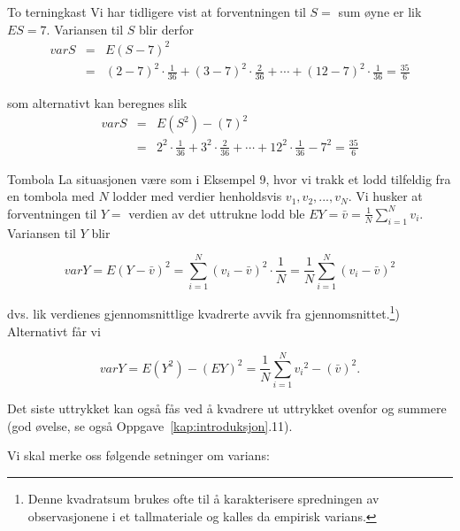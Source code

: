 \begin{eksempel}{To terningkast}
Vi har tidligere vist at forventningen til $S =$ sum øyne er lik
$ES=7$. Variansen til $S$ blir derfor
\begin{eqnarray*}
 varS&=&E{(S-7)}^2\\
 &=& {(2-7)}^2 \cdot \frac{1}{36}+{(3-7)}^2 \cdot \frac{2}{36}+ \cdots
           +{(12-7)}^2 \cdot \frac{1}{36}=\frac{35}{6}
\end{eqnarray*}

\noindent som alternativt kan beregnes slik
\begin{eqnarray*}
 varS&=&E(S^2)-{(7)}^2 \\
 &=& 2^2 \cdot \frac{1}{36}+3^2 \cdot \frac{2}{36}+ \cdots
            +{12}^2 \cdot \frac{1}{36}-7^2 =\frac{35}{6}
\end{eqnarray*}
\end{eksempel}
\begin{eksempel}{Tombola}
La situasjonen være som i Eksempel 9, hvor vi trakk et lodd
tilfeldig fra en tombola med $N$ lodder med verdier henholdsvis
$v_1, v_2, ..., v_N$. Vi husker at forventningen til $Y =$
verdien av det uttrukne lodd ble $EY=\bar{v}=\frac{1}{N}\sum_{i=1}^Nv_i$.
Variansen til $Y$ blir

\[   varY=E{(Y-\bar{v})}^2=\sum_{i=1}^N{(v_i-\bar{v})}^2 \cdot \frac{1}{N}=
                   \frac{1}{N} \sum_{i=1}^N{(v_i-\bar{v})}^2  \]
 
\noindent dvs. lik verdienes gjennomsnittlige kvadrerte avvik fra
gjennomsnittet.\footnote{Denne kvadratsum brukes ofte til å
karakterisere spredningen av observasjonene i et tallmateriale og
kalles da empirisk varians.}) Alternativt får vi

\[   varY=E(Y^2)-(EY)^2=\frac{1}{N}\sum_{i=1}^N{v_i}^2 -{(\bar{v})}^2. \]

\noindent Det siste uttrykket kan også fås ved å kvadrere ut 
	uttrykket ovenfor og summere (god øvelse, se også Oppgave~\ref*{kap:introduksjon}.11).
\end{eksempel}

\noindent Vi skal merke oss følgende setninger om varians:

